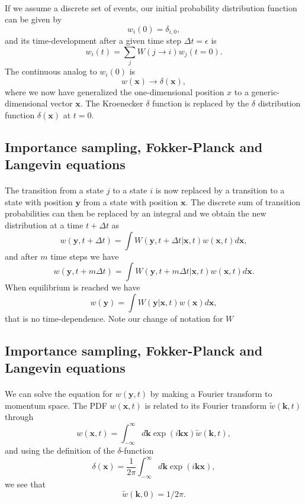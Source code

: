 \documentclass[%
twoside,                 %
final,                   %
10pt]{article}
\begin{document}
\paragraph{}
If we assume a discrete set of events,
our initial probability
distribution function can be  given by 
\[
   w_i(0) = \delta_{i,0},
\]
and its time-development after a given time step $\Delta t=\epsilon$ is
\[ 
   w_i(t) = \sum_{j}W(j\rightarrow i)w_j(t=0).
\] 
The continuous analog to $w_i(0)$ is
\[
   w(\mathbf{x})\rightarrow \delta(\mathbf{x}),
\]
where we now have generalized the one-dimensional position $x$ to a generic-dimensional  
vector $\mathbf{x}$. The Kroenecker $\delta$ function is replaced by the $\delta$ distribution
function $\delta(\mathbf{x})$ at  $t=0$.




\subsection*{Importance sampling, Fokker-Planck and Langevin equations}

\paragraph{}
The transition from a state $j$ to a state $i$ is now replaced by a transition
to a state with position $\mathbf{y}$ from a state with position $\mathbf{x}$. 
The discrete sum of transition probabilities can then be replaced by an integral
and we obtain the new distribution at a time $t+\Delta t$ as 
\[
   w(\mathbf{y},t+\Delta t)= \int W(\mathbf{y},t+\Delta t| \mathbf{x},t)w(\mathbf{x},t)d\mathbf{x},
\]
and after $m$ time steps we have
\[
   w(\mathbf{y},t+m\Delta t)= \int W(\mathbf{y},t+m\Delta t| \mathbf{x},t)w(\mathbf{x},t)d\mathbf{x}.
\]
When equilibrium is reached we have
\[
   w(\mathbf{y})= \int W(\mathbf{y}|\mathbf{x}, t)w(\mathbf{x})d\mathbf{x},
\]
that is no time-dependence. Note our change of notation for $W$




\subsection*{Importance sampling, Fokker-Planck and Langevin equations}

\paragraph{}
We can solve the equation for $w(\mathbf{y},t)$ by making a Fourier transform to
momentum space. 
The PDF $w(\mathbf{x},t)$ is related to its Fourier transform
$\tilde{w}(\mathbf{k},t)$ through
\[
   w(\mathbf{x},t) = \int_{-\infty}^{\infty}d\mathbf{k} \exp{(i\mathbf{kx})}\tilde{w}(\mathbf{k},t),
\]
and using the definition of the 
$\delta$-function 
\[
   \delta(\mathbf{x}) = \frac{1}{2\pi} \int_{-\infty}^{\infty}d\mathbf{k} \exp{(i\mathbf{kx})},
\]
 we see that
\[
   \tilde{w}(\mathbf{k},0)=1/2\pi.
\]
\end{document}
